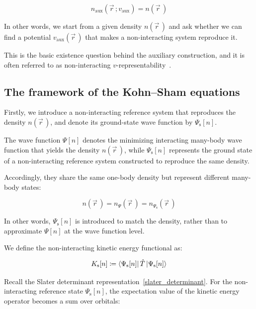 \begin{equation}
    n_\mathrm{aux}(\vec{r}\,;v_\mathrm{aux}) = n(\vec{r}\,)
\label{auxiliary_density_matching_condition_with_potential}
\end{equation}
 
In other words, we start from a given density $n(\vec{r}\,)$ and ask whether we can find a potential $v_\mathrm{aux}(\vec{r}\,)$ that makes a non-interacting system reproduce it.

This is the basic existence question behind the auxiliary construction,
and it is often referred to as non-interacting $v$-representability~\cite{de2012pure}.

\FloatBarrier
\subsection{The framework of the Kohn--Sham equations}

Firstly, we introduce a non-interacting reference system that reproduces the density $n(\vec{r}\,)$, and denote its ground-state wave function by $\Psi_\mathrm{s}[n]$.

The wave function $\Psi[n]$ denotes the minimizing interacting many-body wave function that yields the density $n(\vec{r}\,)$,
while $\Psi_\mathrm{s}[n]$ represents the ground state of a non-interacting reference system constructed to reproduce the same density.

Accordingly, they share the same one-body density but represent different many-body states:

\begin{equation}
n(\vec{r}\,) = n_{\Psi}(\vec{r}\,) = n_{\Psi_\mathrm{s}}(\vec{r}\,)
\label{density_equal_Psi_Psis}
\end{equation}

In other words, $\Psi_\mathrm{s}[n]$ is introduced to match the density, rather than to approximate $\Psi[n]$ at the wave function level.

We define the non-interacting kinetic energy functional as:

\begin{equation}
    K_\mathrm{s}[n]\coloneqq\bra{\Psi_\mathrm{s}[n]}\hat{T}\ket{\Psi_\mathrm{s}[n]}
\label{Ts_definition}
\end{equation}

Recall the Slater determinant representation~\eqref{slater_determinant}.
For the non-interacting reference state $\Psi_\mathrm{s}[n]$,
the expectation value of the kinetic energy operator becomes a sum over orbitals:

